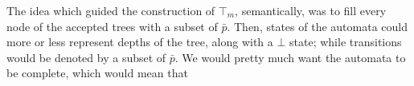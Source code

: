 \documentclass[10pt]{article}
\begin{document}
The idea which guided the construction of $\top_m$, semantically, was to fill every node of the accepted trees with a subset of $\bar{p}$. Then, states of the automata could more or less represent depths of the tree, along with a $\bot$ state; while transitions would be denoted by a subset of $\bar{p}$. We would pretty much want the automata to be complete, which would mean that
\end{document}
